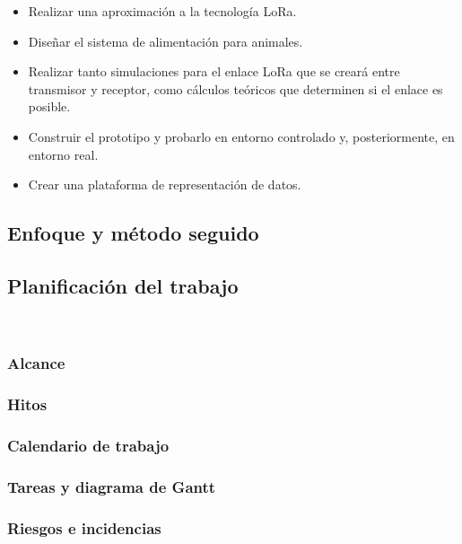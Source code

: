 \documentclass[12pt]{article}
\begin{document}
	\begin{itemize}
		\item Realizar una aproximación a la tecnología LoRa.
		\item Diseñar el sistema de alimentación para animales.
		\item Realizar tanto simulaciones para el enlace LoRa que se creará entre transmisor y receptor, como cálculos teóricos que determinen si el enlace es posible.
		\item Construir el prototipo y probarlo en entorno controlado y, posteriormente, en entorno real.
		\item Crear una plataforma de representación de datos.
	\end{itemize}
	
	\subsection[Enfoque y método seguido]{Enfoque y método seguido}
	\subsection[Planificación del trabajo]{Planificación del trabajo}
	
	 \\
	
	\subsubsection[Alcance]{Alcance}
	\subsubsection[Hitos]{Hitos}	
	\subsubsection[Calendario de trabajo]{Calendario de trabajo}
	\subsubsection[Tareas y diagrama de Gantt]{Tareas y diagrama de Gantt}
	\subsubsection[Riesgos e incidencias]{Riesgos e incidencias}
\end{document}
